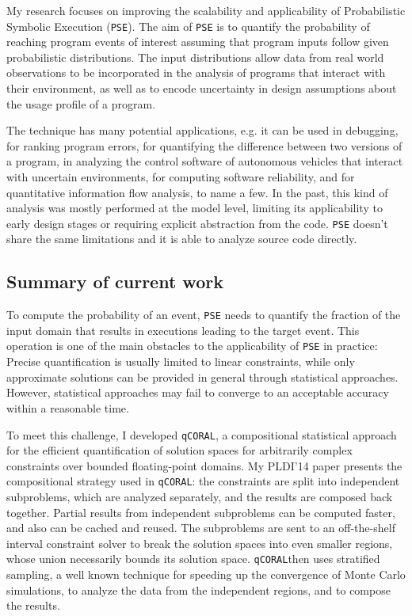 \documentclass[12pt]{article}
\newcounter{list}
\begin{document}
\newcommand{\PSE}{\texttt{PSE}}
\newcommand{\qCORAL}{\texttt{qCORAL}}
\raisebox{1cm}

My research focuses on improving the scalability and applicability of
Probabilistic Symbolic Execution (\PSE{}). The aim of \PSE{}
\cite{borges2015iterative} is to quantify the probability of reaching
program events of interest assuming that program inputs follow given
probabilistic distributions. The input distributions allow data from
real world observations to be incorporated in the analysis of programs
that interact with their environment, as well as to encode uncertainty
in design assumptions about the usage profile of a program.

The technique has many potential applications, e.g. it can be used in
debugging, for ranking program errors, for quantifying the difference
between two versions of a program, in analyzing the control software
of autonomous vehicles that interact with uncertain environments, for
computing software reliability, and for quantitative information flow
analysis, to name a few. In the past, this kind of analysis was mostly
performed at the model level, limiting its applicability to early
design stages or requiring explicit abstraction from the code. \PSE{}
doesn't share the same limitations and it is able to analyze source
code directly.

\subsection*{Summary of current work}

To compute the probability of an event, \PSE{} needs to quantify the
fraction of the input domain that results in executions leading to the
target event. This operation is one of the main obstacles to the
applicability of \PSE{} in practice: Precise quantification is usually
limited to linear constraints, while only approximate solutions can be
provided in general through statistical approaches. However,
statistical approaches may fail to converge to an acceptable accuracy
within a reasonable time.

To meet this challenge, I developed
\qCORAL\cite{borges2014compositional}, a compositional statistical
approach for the efficient quantification of solution spaces for
arbitrarily complex constraints over bounded floating-point
domains. My PLDI'14 paper presents the compositional strategy used in
\qCORAL: the constraints are split into independent subproblems, which
are analyzed separately, and the results are composed back
together. Partial results from independent subproblems can be computed
faster, and also can be cached and reused. The subproblems are sent to
an off-the-shelf interval constraint solver to break the solution
spaces into even smaller regions, whose union necessarily bounds its
solution space.  \qCORAL then uses stratified sampling, a well known
technique for speeding up the convergence of Monte Carlo simulations,
to analyze the data from the independent regions, and to compose the
results.
\end{document}
